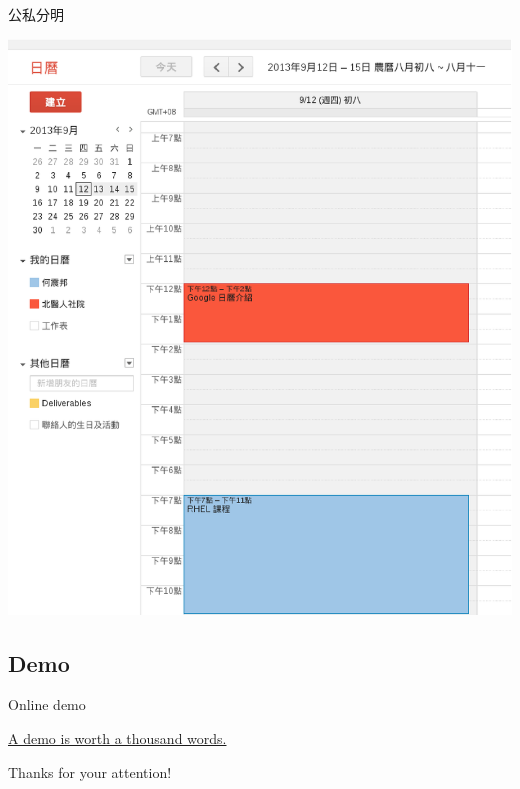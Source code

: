 \documentclass{beamer}
\begin{document}
\begin{frame}{公私分明}
  \begin{center}
    \includegraphics[scale=0.3]{clarity.eps}
  \end{center}
\end{frame}

\subsection{Demo}
\begin{frame}{Online demo}
  \begin{center}
    \href{https://www.google.com/calendar/render}{\LARGE A demo is worth a thousand words.}
  \end{center}
\end{frame}

\begin{frame}
  \begin{center}
    \huge Thanks for your attention!
  \end{center}
\end{frame}
\end{document}

